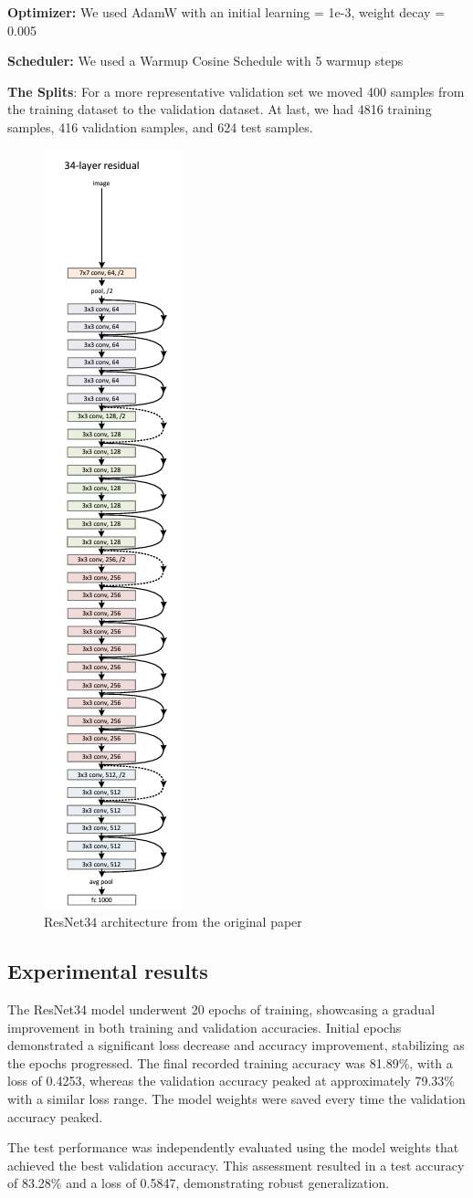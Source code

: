 \documentclass{article}
\begin{document}
\textbf{Optimizer:} We used AdamW with an initial learning = 1e-3, weight decay = 0.005

\textbf{Scheduler:} We used a Warmup Cosine Schedule with 5 warmup steps

\textbf{The Splits}: For a more representative validation set we moved 400 samples from the training dataset to the validation dataset. At last, we had 4816 training samples, 416 validation samples, and 624 test samples.

\begin{figure}
  \centering
  \includegraphics[width=0.15\linewidth, angle=90]{resnet.png}
  \caption{ResNet34 architecture from the original paper}
  \label{fig:resnet}
\end{figure}

\subsection{Experimental results}
The ResNet34 model underwent 20 epochs of training, showcasing a gradual improvement in both training and validation accuracies. Initial epochs demonstrated a significant loss decrease and accuracy improvement, stabilizing as the epochs progressed. The final recorded training accuracy was 81.89\%, with a loss of 0.4253, whereas the validation accuracy peaked at approximately 79.33\% with a similar loss range. The model weights were saved every time the validation accuracy peaked.

The test performance was independently evaluated using the model weights that achieved the best validation accuracy. This assessment resulted in a test accuracy of 83.28\% and a loss of 0.5847, demonstrating robust generalization.
\end{document}
